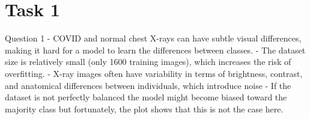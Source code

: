 \section{Task 1}
Question 1
-	COVID and normal chest X-rays can have subtle visual differences, making it hard for a model to learn the differences between classes.
-	The dataset size is relatively small (only 1600 training images), which increases the risk of overfitting.
-	X-ray images often have variability in terms of brightness, contrast, and anatomical differences between individuals, which introduce noise
-	If the dataset is not perfectly balanced the model might become biased toward the majority class but fortunately, the plot shows that this is not the case here.
